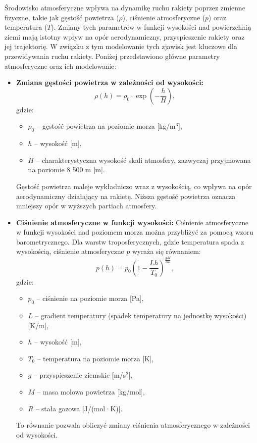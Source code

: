 Środowisko atmosferyczne wpływa na dynamikę ruchu rakiety poprzez zmienne fizyczne, takie jak gęstość powietrza ($\rho$), ciśnienie atmosferyczne ($p$) oraz temperatura ($T$). Zmiany tych parametrów w funkcji wysokości nad powierzchnią ziemi mają istotny wpływ na opór aerodynamiczny, przyspieszenie rakiety oraz jej trajektorię. W związku z tym modelowanie tych zjawisk jest kluczowe dla przewidywania ruchu rakiety. Poniżej przedstawiono główne parametry atmosferyczne oraz ich modelowanie:

\begin{itemize}
    \item \textbf{Zmiana gęstości powietrza w zależności od wysokości:}
    \begin{equation}
    \rho(h) = \rho_0 \cdot \exp\left(-\frac{h}{H}\right),
    \label{eq:density}
    \end{equation}
    gdzie:
    \begin{itemize}
        \item $\rho_0$ -- gęstość powietrza na poziomie morza [kg/m$^3$],
        \item $h$ -- wysokość [m],
        \item $H$ -- charakterystyczna wysokość skali atmosfery, zazwyczaj przyjmowana na poziomie 8 500 m [m].
    \end{itemize}
    Gęstość powietrza maleje wykładniczo wraz z wysokością, co wpływa na opór aerodynamiczny działający na rakietę. Niższa gęstość powietrza oznacza mniejszy opór w wyższych partiach atmosfery.

    \item \textbf{Ciśnienie atmosferyczne w funkcji wysokości:}
    Ciśnienie atmosferyczne w funkcji wysokości nad poziomem morza można przybliżyć za pomocą wzoru barometrycznego. Dla warstw troposferycznych, gdzie temperatura spada z wysokością, ciśnienie atmosferyczne $p$ wyraża się równaniem:
    \begin{equation}
    p(h) = p_0 \left(1 - \frac{L h}{T_0}\right)^{\frac{g M}{R L}},
    \label{eq:pressure}
    \end{equation}
    gdzie:
    \begin{itemize}
        \item $p_0$ -- ciśnienie na poziomie morza [Pa],
        \item $L$ -- gradient temperatury (spadek temperatury na jednostkę wysokości) [K/m],
        \item $h$ -- wysokość [m],
        \item $T_0$ -- temperatura na poziomie morza [K],
        \item $g$ -- przyspieszenie ziemskie [m/s$^2$],
        \item $M$ -- masa molowa powietrza [kg/mol],
        \item $R$ -- stała gazowa [J/(mol·K)].
    \end{itemize}
    To równanie pozwala obliczyć zmiany ciśnienia atmosferycznego w zależności od wysokości.


\end{itemize}
